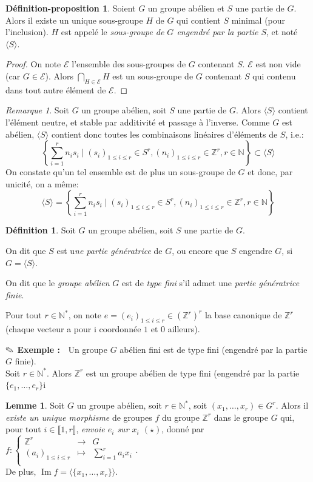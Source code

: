 \documentclass{article}
\newcommand{\Z}{\mathbb{Z}}
\newcommand{\N}{\mathbb{N}}
\newcommand{\im}{\mathop{\mathrm{Im}}\nolimits}
\newcommand{\dis}{\displaystyle}
\newcommand{\nt}[1]{\llbracket  #1 \rrbracket }
\theoremstyle{definition}
\newtheorem{defi}{Définition}
\newtheorem{depro}{Définition-proposition}
\newtheorem{lem}{Lemme}
\theoremstyle{remark}
\newtheorem{rem}{Remarque}
\newcommand{\exem}{{\textbf{$\text{\ding{46}}$ Exemple : \ }}}
\newcommand{\app}[5]{#1:\left\{\begin{array}{rcl}
#2 & \longrightarrow & #3 \\
#4 & \longmapsto & #5  \\
\end{array}\right.
}
\begin{document}
\begin{depro}
Soient $G$ un groupe abélien et $S$ une partie de $G$. Alors il existe un unique sous-groupe $H$ de $G$ qui contient $S$ minimal (pour l'inclusion). $H$ est appelé le \textit{sous-groupe de $G$ engendré par la partie $S$}, et noté $\langle S\rangle$.
\end{depro}

\begin{proof}
On note $\mathcal{E}$ l'ensemble des sous-groupes de $G$ contenant $S$. $\mathcal{E}$ est non vide (car $G \in\mathcal{E}$). Alors $\dis \bigcap_{H \in \mathcal{E}} H$ est un sous-groupe de $G$ contenant $S$ qui contenu dans tout autre élément de $\mathcal{E}$.
\end{proof}

\begin{rem}
Soit $G$ un groupe abélien, soit $S$ une partie de $G$. Alors $\langle S\rangle$ contient l'élément neutre, et stable par additivité et passage à l'inverse. Comme $G$ est abélien, $\langle S\rangle$ contient donc toutes les combinaisons linéaires d'éléments de $S$, i.e.:
$$\left\{\dis \sum_{i=1}^r n_is_i \mid (s_i)_{1 \leqslant i \leqslant r} \in S^r, (n_i)_{1 \leqslant i \leqslant r} \in \Z^r, r \in \N \right\}\subset\langle S\rangle$$
On constate qu'un tel ensemble est de plus un sous-groupe de $G$ et donc, par unicité, on a m\^eme:
$$\langle S\rangle=\left\{\dis \sum_{i=1}^r n_is_i \mid (s_i)_{1 \leqslant i \leqslant r} \in S^r, (n_i)_{1 \leqslant i \leqslant r} \in \Z^r, r \in \N \right\}$$
\end{rem}

\begin{defi}
Soit $G$ un groupe abélien, soit $S$ une partie de $G$. 
\begin{point}
\item On dit que $S$ est u\textit{ne partie génératrice} de $G$, ou encore que $S$ engendre $G$, si $G=\langle S\rangle$.
\item On dit que le \textit{groupe abélien} $G$ est de \textit{type fini} s'il admet une \textit{partie génératrice finie}. 
\end{point}
\end{defi}

Pour tout $r \in \N^*$, on note $e=(e_i)_{1 \leqslant i \leqslant r} \in \left(\Z^r\right)^r$ la base canonique de $\Z^r$ (chaque vecteur a pour i coordonnée $1$ et $0$ ailleurs).

\exem Un groupe $G$ abélien fini est de type fini (engendré par la partie $G$ finie). \\
Soit $r \in \N^*$. Alors $\Z^r$ est un groupe abélien de type fini (engendré par la partie $\{e_1, \ldots, e_r \}$i
\begin{lem}\label{morphisme-Zr-G}
Soit $G$ un groupe abélien, soit $r \in \N^*$, soit $(x_1, \ldots, x_r) \in G^r$. Alors il \textit{existe un unique morphisme} de groupes $f$ du groupe $\Z^r$ dans le groupe $G$ qui, pour tout $i \in \nt{1,r}$, \textit{envoie $e_i$ sur $x_i$ $(\star)$}, donné par $\app{f}{\Z^r}{G}{(a_i)_{1 \leqslant i \leqslant r}}{\dis \sum_{i=1}^ra_ix_i}$. \\ De plus, $\im f =\langle\{x_1, \ldots, x_r\}\rangle$.
\end{lem}
\end{document}
